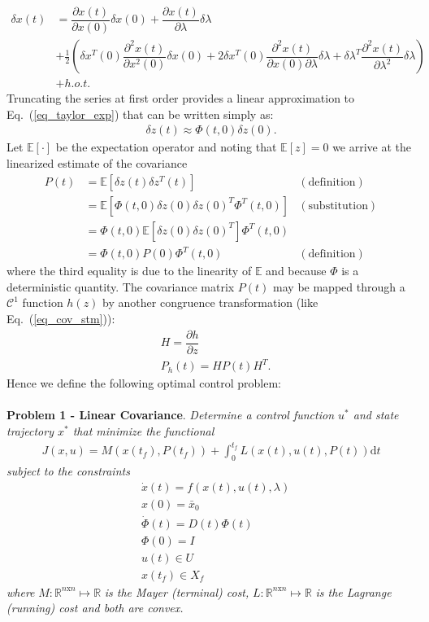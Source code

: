 \documentclass[10pt,a4paper]{article}
\begin{document}
	\begin{align}
	\delta x(t) &= \dfrac{\partial x(t)}{\partial x(0)} \delta x(0) + \dfrac{\partial x(t)}{\partial \lambda} \delta \lambda \nonumber\\
	&+\frac{1}{2}\left(\delta x^T(0) \dfrac{\partial^2 x(t)}{\partial x^2(0)} \delta x(0) + 2\delta x^T(0)\dfrac{\partial^2 x(t)}{\partial x(0)\partial\lambda} \delta \lambda +\delta \lambda^T \dfrac{\partial^2 x(t)}{\partial \lambda^2} \delta \lambda\right) \label{eq_taylor_exp}\\
	\nonumber &+ h.o.t.
	\end{align}
	Truncating the series at first order provides a linear approximation to Eq.~(\ref{eq_taylor_exp}) that can be written simply as:
	\begin{align}
	\delta z(t) \approx \Phi(t,0)\delta z(0).
	\end{align}
	Let $\mathbb{E}[\cdot]$ be the expectation operator and noting that $\mathbb{E}[z]=0$ we arrive at the linearized estimate of the covariance
	\begin{align}
	P(t) &= \mathbb{E}[\delta z(t)\delta z^T(t)] &\mathrm{ (definition)} \\
	     &= \mathbb{E}[\Phi(t,0)\delta z(0)\delta z(0)^T\Phi^T(t,0)] &\mathrm{(substitution)} \\
	     &= \Phi(t,0)\mathbb{E}[\delta z(0)\delta z(0)^T] \Phi^T(t,0) \\
	     &= \Phi(t,0)P(0)\Phi^T(t,0) &\mathrm{ (definition)} \label{eq_cov_stm}
	\end{align}
	where the third equality is due to the linearity of $\mathbb{E}$ and because $\Phi$ is a deterministic quantity. The covariance matrix $P(t)$ may be mapped through a $\mathcal{C}^1$ function $h(z)$ by another congruence transformation (like Eq.~(\ref{eq_cov_stm})):
	\begin{align}
	&H = \dfrac{\partial h}{\partial z} \\
	&P_h(t) = HP(t)H^T.
	\end{align}
	Hence we define the following optimal control problem:
	\\\\
	\textbf{Problem 1 - Linear Covariance}. \textit{Determine a control function $ u^* $ and state trajectory $ x^* $ that minimize the functional}
	\begin{align}
	J(x,u) = M(x(t_f),P(t_f)) + \int_{0}^{t_f}L(x(t),u(t),P(t))\mathrm{d}t
	\end{align}
	\textit{	subject to the constraints }
	\begin{align}
	&\dot{x}(t) = f(x(t),u(t),\lambda) \\
	&x(0) = \bar{x}_0 \\
	&\dot{\Phi}(t) = D(t)\Phi(t) \\
	&\Phi(0) = I \\
	&u(t) \in U \\
	&x(t_f) \in X_f
	\end{align}
	\textit{where} $ M:\mathbb{R}^{n\mathrm{x}n}\mapsto \mathbb{R} $ \textit{is the Mayer (terminal) cost,}  $L:\mathbb{R}^{n\mathrm{x}n}\mapsto\mathbb{R}$ \textit{ is the Lagrange (running) cost and both are convex.}
	
\end{document}
